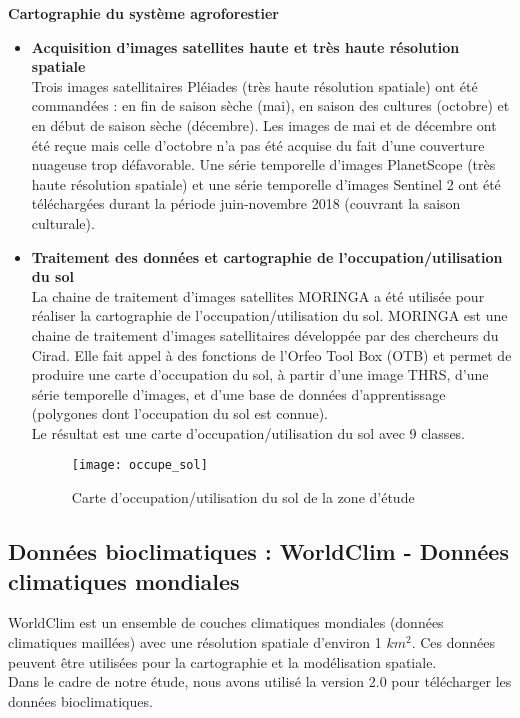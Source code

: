 \documentclass[a4paper, oneside, 12pt]{book}
\begin{document}
\textbf{Cartographie du système agroforestier}\\
\begin{itemize}
	\item \textbf{Acquisition d’images satellites haute et très haute résolution spatiale}\\
	Trois images satellitaires Pléiades (très haute résolution spatiale) ont été commandées : en fin de saison sèche (mai), en saison des cultures (octobre) et en début de saison sèche (décembre). Les images de mai et de décembre ont été reçue mais celle d’octobre n’a pas été acquise du fait d’une couverture nuageuse trop défavorable.
	Une série temporelle d’images PlanetScope (très haute résolution spatiale) et une série temporelle d’images Sentinel 2 ont été téléchargées durant la période juin-novembre 2018 (couvrant la saison culturale).
	\item \textbf{Traitement des données et cartographie de l’occupation/utilisation du sol}\\
	La chaine de traitement d’images satellites MORINGA a été utilisée pour réaliser la cartographie de l’occupation/utilisation du sol. MORINGA est une chaine de traitement d’images satellitaires développée par des chercheurs du Cirad.  Elle fait appel à des fonctions de l’Orfeo Tool Box (OTB) et permet de produire une carte d’occupation du sol, à partir d’une image THRS, d’une série temporelle d’images, et d’une base de données d’apprentissage (polygones dont l’occupation du sol est connue).\\
	Le résultat est une carte d’occupation/utilisation du sol avec 9 classes.
	\begin{figure}[H]
		\centering
		\caption{Carte d'occupation/utilisation du sol de la zone d'étude}
		\texttt{[image: occupe\_sol]}	
	\end{figure}
\end{itemize}
\subsection{Données bioclimatiques : WorldClim - Données climatiques mondiales}
WorldClim est un ensemble de couches climatiques mondiales (données climatiques maillées) avec une résolution spatiale d'environ  1 $km^2$. Ces données peuvent être utilisées pour la cartographie et la modélisation spatiale.\\
Dans le cadre de notre étude, nous avons utilisé la version 2.0 pour télécharger les données bioclimatiques.\\
\end{document}
